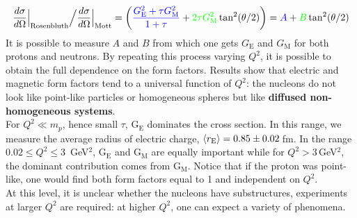 \documentclass[10.75pt,a4paper,openright,bottom=2cm]{article}
\begin{document}
\[
\frac{d\sigma}{d\Omega}\Bigr|_{\substack{\text{Rosenbluth}}}\Bigr/\frac{d\sigma}{d\Omega}\Bigr|_{\substack{\text{Mott}}}=\left({\color{blue}\frac{G_{\text{E}}^2+\tau G_{\text{M}}^2}{1+\tau}}+{\color{green}2\tau G_{\text{M}}^2}\tan^2(\theta/2)\right)={\color{blue}A}+{\color{green}B}\tan^2(\theta/2)
\]
It is possible to measure $A$ and $B$ from which one gets $G_{\text{E}}$ and $G_{\text{M}}$ for both protons and neutrons. By repeating this process varying $Q^2$, it is possible to obtain the full dependence on the form factors. Results show that electric and magnetic form factors tend to a universal function of $Q^2$: the nucleons do not look like point-like particles or homogeneous spheres but like \textbf{diffused non-homogeneous systems}.\\
For $Q^2\ll m_p$, hence small $\tau$, G$_{\text{E}}$ dominates the cross section. In this range, we measure the average radius of electric charge, $\braket{r_{\text{E}}}=0.85\pm0.02$\,fm. In the range $0.02\le Q^2\le3$\, GeV$^2$, G$_{\text{E}}$ and G$_{\text{M}}$ are equally important while for $Q^2>3$\,GeV$^2$, the dominant contribution comes from G$_{\text{M}}$. Notice that if the proton was point-like, one would find both form factors equal to 1 and independent on $Q^2$.\\
At this level, it is unclear whether the nucleons have substructures, experiments at larger $Q^2$ are required: at higher $Q^2$, one can expect a variety of phenomena. 
\end{document}
